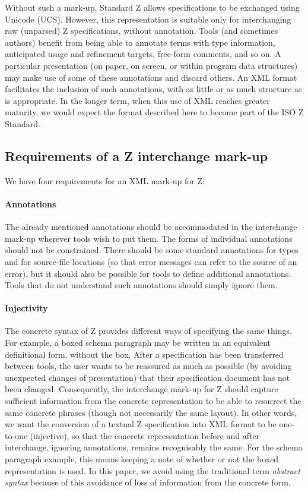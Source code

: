 \documentclass{llncs}  %
\begin{document}
Without such a mark-up, Standard Z allows specifications to be exchanged
using Unicode (UCS\cite{ISO10646-1,ISO10646-2}).
However, this representation is suitable only
for interchanging raw (unparsed) Z specifications, without annotation.
Tools (and sometimes authors) benefit from being able to annotate terms
with type information, anticipated usage and refinement targets, free-form
comments, and so on.   A particular presentation (on paper, on screen, or
within program data structures) may make use of some of these annotations
and discard others.  An XML format facilitates the inclusion of such
annotations, with as little or as much structure as is appropriate.  In
the longer term, when this use of XML reaches greater maturity, we would
expect the format described here to become part of the ISO Z Standard.


\subsection{Requirements of a Z interchange mark-up}\label{injectivity}

We have four requirements for an XML mark-up for Z:
 
\paragraph{Annotations}
The already mentioned annotations should be accommodated
in the interchange mark-up wherever tools wish to put them.
The forms of individual annotations should not be constrained.
There should be some standard annotations for types and for
source-file locations (so that error messages can refer to the
source of an error), but it should also be possible for tools
to define additional annotations.  Tools that do not understand
such annotations should simply ignore them.

\paragraph{Injectivity}
The concrete syntax of Z provides different ways of specifying the 
same things.  For example, a boxed schema paragraph
may be written in an equivalent definitional form, without the box.
After a specification has been transferred between tools, the user wants
to be reassured as much as possible (by avoiding unexpected changes 
of presentation) that their specification document has not been changed.
Consequently, the interchange mark-up for Z should capture
sufficient information from the concrete representation 
to be able to resurrect the same concrete phrases
(though not necessarily the same layout).
In other words, we want the conversion of a textual Z specification into 
XML format to be one-to-one (injective), so that the concrete 
representation before and after interchange, ignoring annotations,
remains recognisably the same.
For the schema paragraph example, this means keeping a note of whether 
or not the boxed representation is used. 
In this paper, we avoid using the traditional term \textit{abstract syntax}
because of this avoidance of loss of information from the concrete form.
\end{document}
